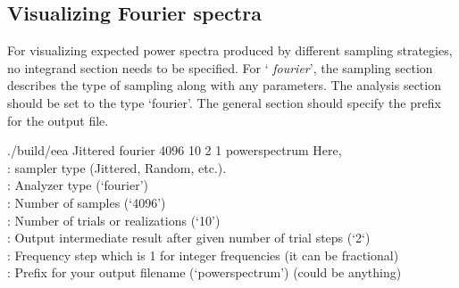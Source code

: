 \subsection{Visualizing Fourier spectra}
\label{sec:Fanalyzer}
For visualizing expected power spectra produced by different sampling strategies, no integrand section needs to be specified. For ` \emph{fourier}',  the sampling section describes the type of sampling along with any parameters. The analysis section should be set to the type `fourier'. The general section should specify the prefix for the output file. 
%
\begin{tcolorbox}
./build/eea   Jittered   fourier  4096  10    2  1   powerspectrum
\tcblower
Here, \\
: sampler type (Jittered, Random, etc.). \\
:  Analyzer type (`fourier') \\
: Number of samples (`4096') \\
: Number of trials or realizations (`10') \\
:  Output intermediate result after given number of trial steps (`2`) \\
: Frequency step which is 1 for integer frequencies (it can be fractional)\\
: Prefix for your output filename (`powerspectrum') (could be anything)
\end{tcolorbox}
%


